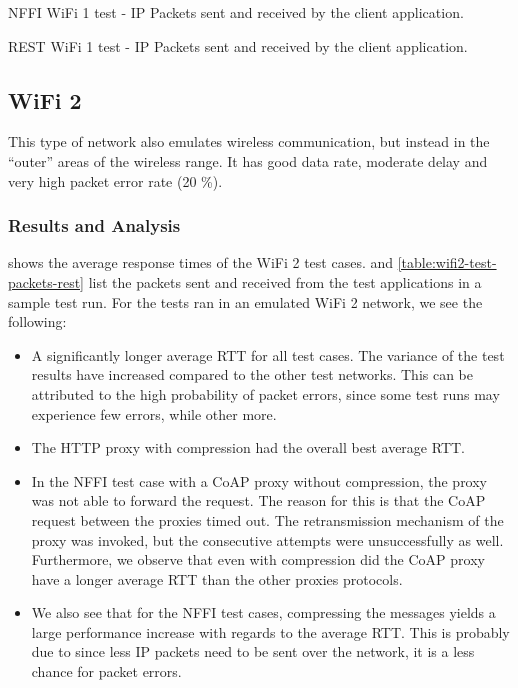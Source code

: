 \begin{table}[h]

\caption{NFFI WiFi 1 test - IP Packets sent and received by the client application.}
\label{table:wifi1-test-packets-nffi}
\end{table}

\begin{table}[h]

\caption{REST WiFi 1 test - IP Packets sent and received by the client application.}
\label{table:wifi1-test-packets-rest}
\end{table}


\subsection{WiFi 2}

This type of network also emulates wireless communication, but instead in the
``outer'' areas of the wireless range. It has good data rate, moderate delay
and very high packet error rate (20 \%).


\subsubsection{Results and Analysis}

 shows the average response times of the WiFi 2 test
cases.  and
\cref{table:wifi2-test-packets-rest} list the packets sent and received from the
test applications in a sample test run. For the tests ran in an emulated WiFi 2
network, we see the following:

\begin{itemize}

    \item A significantly longer average RTT for all test cases. The
    variance of the test results have increased compared to the other test
    networks. This can be attributed to the high probability of packet errors,
    since some test runs may experience few errors, while other more.

    \item The HTTP proxy with compression had the overall best average
    RTT.

    \item In the NFFI test case with a CoAP proxy without compression, the proxy
    was not able to forward the request. The reason for this is that the CoAP
    request between the proxies timed out. The retransmission mechanism of the
    proxy was invoked, but the consecutive attempts were unsuccessfully as well.
    Furthermore, we observe that even with compression did the CoAP proxy have a longer
    average RTT than the other proxies protocols.

    \item We also see that for the NFFI test cases, compressing the messages
    yields a large performance increase with regards to the average RTT. This is
    probably due to since less IP packets need to be sent over the network, it
    is a less chance for packet errors.

\end{itemize}


